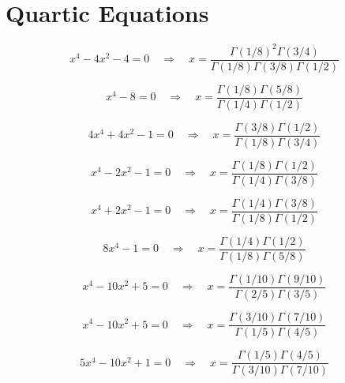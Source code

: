 \documentclass[11pt,a4paper]{article}
\begin{document}
\section{Quartic Equations}

\begin{equation}\label{eq:78}
x^{4} - 4x^{2} - 4 = 0 \quad \Rightarrow \quad x = \frac{\Gamma(1/8)^2\Gamma(3/4)}{\Gamma(1/8)\Gamma(3/8)\Gamma(1/2)}
\end{equation}

\begin{equation}\label{eq:79}
x^{4} - 8 = 0 \quad \Rightarrow \quad x = \frac{\Gamma(1/8)\Gamma(5/8)}{\Gamma(1/4)\Gamma(1/2)}
\end{equation}

\begin{equation}\label{eq:80}
4x^{4} + 4x^{2} - 1 = 0 \quad \Rightarrow \quad x = \frac{\Gamma(3/8)\Gamma(1/2)}{\Gamma(1/8)\Gamma(3/4)}
\end{equation}

\begin{equation}\label{eq:81}
x^{4} - 2x^{2} - 1 = 0 \quad \Rightarrow \quad x = \frac{\Gamma(1/8)\Gamma(1/2)}{\Gamma(1/4)\Gamma(3/8)}
\end{equation}

\begin{equation}\label{eq:82}
x^{4} + 2x^{2} - 1 = 0 \quad \Rightarrow \quad x = \frac{\Gamma(1/4)\Gamma(3/8)}{\Gamma(1/8)\Gamma(1/2)}
\end{equation}

\begin{equation}\label{eq:83}
8x^{4} - 1 = 0 \quad \Rightarrow \quad x = \frac{\Gamma(1/4)\Gamma(1/2)}{\Gamma(1/8)\Gamma(5/8)}
\end{equation}

\begin{equation}\label{eq:84}
x^{4} - 10x^{2} + 5 = 0 \quad \Rightarrow \quad x = \frac{\Gamma(1/10)\Gamma(9/10)}{\Gamma(2/5)\Gamma(3/5)}
\end{equation}

\begin{equation}\label{eq:85}
x^{4} - 10x^{2} + 5 = 0 \quad \Rightarrow \quad x = \frac{\Gamma(3/10)\Gamma(7/10)}{\Gamma(1/5)\Gamma(4/5)}
\end{equation}

\begin{equation}\label{eq:86}
5x^{4} - 10x^{2} + 1 = 0 \quad \Rightarrow \quad x = \frac{\Gamma(1/5)\Gamma(4/5)}{\Gamma(3/10)\Gamma(7/10)}
\end{equation}
\end{document}
